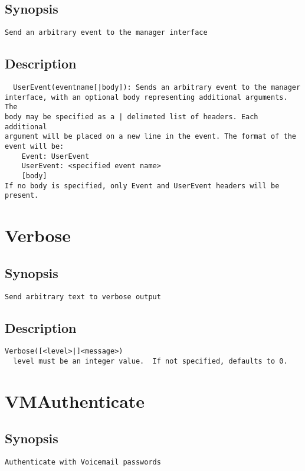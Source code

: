 \subsection{Synopsis}
\begin{verbatim}
Send an arbitrary event to the manager interface
\end{verbatim}
\subsection{Description}
\begin{verbatim}
  UserEvent(eventname[|body]): Sends an arbitrary event to the manager
interface, with an optional body representing additional arguments.  The
body may be specified as a | delimeted list of headers. Each additional
argument will be placed on a new line in the event. The format of the
event will be:
    Event: UserEvent
    UserEvent: <specified event name>
    [body]
If no body is specified, only Event and UserEvent headers will be present.

\end{verbatim}


\section{Verbose}
\subsection{Synopsis}
\begin{verbatim}
Send arbitrary text to verbose output
\end{verbatim}
\subsection{Description}
\begin{verbatim}
Verbose([<level>|]<message>)
  level must be an integer value.  If not specified, defaults to 0.

\end{verbatim}


\section{VMAuthenticate}
\subsection{Synopsis}
\begin{verbatim}
Authenticate with Voicemail passwords
\end{verbatim}

